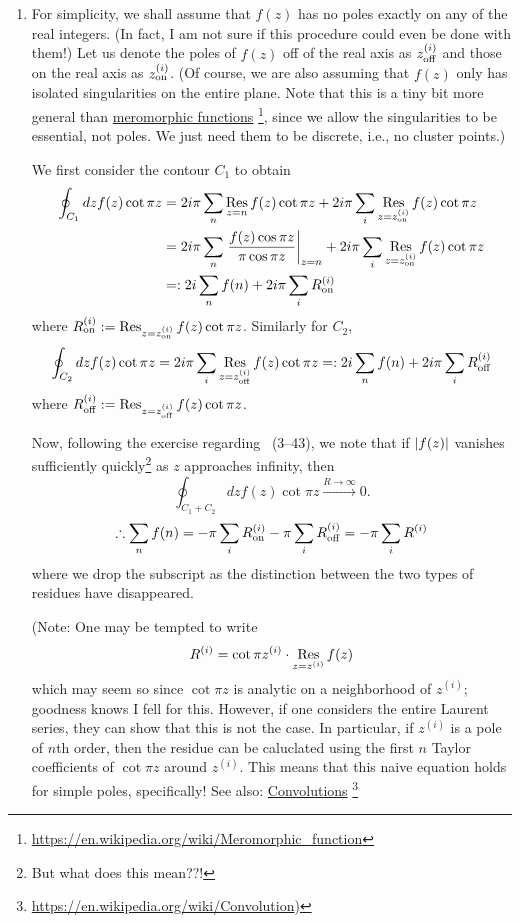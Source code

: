 \begin{enumerate}[wide, labelindent = 0pt, label = (\alph*)]
\item
For simplicity, we shall assume that $f(z)$ has no poles exactly on any of the real integers.
(In fact, I am not sure if this procedure could even be done with them!)
Let us denote the poles of $f(z)$ off of the real axis as $z_{\text{off}}^{\left( i \right)}$
and those on the real axis as $z_{\text{on}}^{\left( i \right)}$.
(Of course, we are also assuming that $f(z)$ only has isolated singularities on the entire plane.
Note that this is a tiny bit more general than \href{https://en.wikipedia.org/wiki/Meromorphic_function}{meromorphic functions}%
\footnote{\url{https://en.wikipedia.org/wiki/Meromorphic_function}}, since we allow the singularities to be essential, not poles.
We just need them to be discrete, i.e., no cluster points.)

We first consider the contour $C_1$ to obtain
\begin{align*}
    \oint_{C_1} dz f(z) \cot \pi z
    &= 2i\pi \sum_n \mathop{\mathrm{Res}}_{z=n}{f(z) \cot \pi z} + 2i\pi \sum_i \mathop{\mathrm{Res}}_{z=z_{\text{on}}^{\left( i \right)}}{f(z) \cot \pi z} \\
    &= 2i\pi \sum_n {\left. \frac{f(z) \cos \pi z}{\pi \cos \pi z} \right|}_{z=n}
     + 2i\pi \sum_i \mathop{\mathrm{Res}}_{z=z_{\text{on}}^{\left( i \right)}}{f(z) \cot \pi z} \\
    &=: 2i \sum_n f(n) + 2i\pi \sum_i R_{\text{on}}^{\left( i \right)}
\end{align*}
where $R_{\text{on}}^{\left( i \right)} := \mathop{\mathrm{Res}}_{z=z_{\text{on}}^{\left( i \right)}}{f(z) \cot \pi z}$.
Similarly for $C_2$,
\[
    \oint_{C_2} dz f(z) \cot \pi z
    = 2i\pi \sum_i \mathop{\mathrm{Res}}_{z=z_{\text{off}}^{\left( i \right)}}{f(z) \cot \pi z}
    =: 2i \sum_n f(n) + 2i\pi \sum_i R_{\text{off}}^{\left( i \right)}
\]
where $R_{\text{off}}^{\left( i \right)} := \mathop{\mathrm{Res}}_{z=z_{\text{off}}^{\left( i \right)}}{f(z) \cot \pi z}$.

Now, following the exercise regarding ~(3--43), we note that
if $\left| f(z) \right|$ vanishes sufficiently quickly\footnote{But what does this mean??!} as $z$ approaches infinity,
then
\[
    \oint_{C_1 + C_2} dz f(z) \cot \pi z \xrightarrow{R \rightarrow \infty} 0.
\]
\[
    \therefore \sum_n f(n)
    = -\pi \sum_i R_{\text{on}}^{\left( i \right)} - \pi \sum_i R_{\text{off}}^{\left( i \right)}
    = -\pi \sum_i R^{(i)}
\]
where we drop the subscript as the distinction between the two types of residues have disappeared.

(Note: One may be tempted to write
\[
    R^{(i)} = \cot \pi z^{(i)} \cdot \mathop{\mathrm{Res}}_{z=z^{(i)}}{f(z)}
\]
which may seem so since $\cot \pi z$ is analytic on a neighborhood of $z^{(i)}$;
goodness knows I fell for this.
However, if one considers the entire Laurent series, they can show that this is not the case.
In particular, if $z^{(i)}$ is a pole of $n$th order,
then the residue can be caluclated using the first $n$ Taylor coefficients of $\cot \pi z$ around $z^{(i)}$.
This means that this naive equation holds for simple poles, specifically!
See also: \href{https://en.wikipedia.org/wiki/Convolution}{Convolutions}%
\footnote{\url{https://en.wikipedia.org/wiki/Convolution})}


\end{enumerate}
